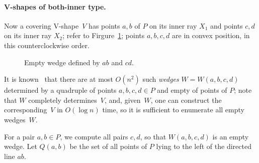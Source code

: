 \documentclass{llncs}
\begin{document}
\paragraph{V-shapes of both-inner type.}
Now a covering V-shape~$V$ has points $a,b$ of $P$ on its inner ray
$X_1$ and points $c,d$ on its inner ray $X_2$; refer to Firgure~\ref{V4}; 
points $a,b,c,d$ are in convex position, in this counterclockwise order.  
\begin{figure}
\centering
{}
\caption{Empty wedge defined by $ab$ and $cd$.}
\label{V4}
\end{figure}
It is known~\cite{EmptyPolygons} that there are at most $O(n^2)$ such
\emph{wedges} $W=W(a,b,c,d)$ determined by a quadruple of points
$a,b,c,d \in P$ and empty of points of $P$; note that $W$ completely
determines~$V$, and, given~$W$, one can construct the
corresponding~$V$ in $O(\log n)$ time,
so it is sufficient to enumerate all empty wedges~$W$.







For a pair $a,b \in P$, we compute all pairs $c,d$, so that
$W(a,b,c,d)$ is an empty wedge.  
Let $Q(a,b)$ be the set of all points of $P$ lying to the left of
the directed line $ab$.  
\end{document}
